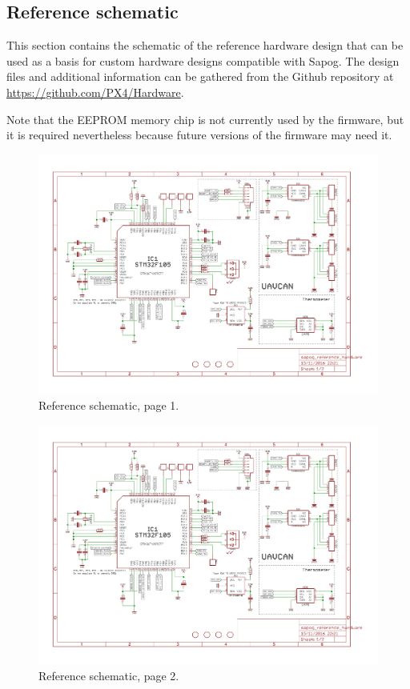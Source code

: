 \documentclass{zubaxdoc}
\begin{document}
\subsection{Reference schematic}

This section contains the schematic of the reference hardware design that can be used as a basis for custom hardware
designs compatible with Sapog.
The design files and additional information can be gathered from the Github repository at
\url{https://github.com/PX4/Hardware}.

Note that the EEPROM memory chip is not currently used by the firmware,
but it is required nevertheless because future versions of the firmware may need it.

\begin{figure}[hbt]
    \centering
    \includegraphics[page=1,angle=90,origin=c,width=1\textwidth]{sapog_reference_hardware.pdf}
	\caption{Reference schematic, page 1.}
\end{figure}

\begin{figure}[hbt]
    \centering
    \includegraphics[page=2,angle=90,origin=c,width=1\textwidth]{sapog_reference_hardware.pdf}
	\caption{Reference schematic, page 2.}
\end{figure}
\end{document}
